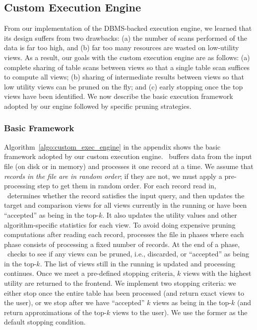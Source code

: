 

\subsection{Custom Execution Engine}
\label{sec:in_memory_execution_engine}

From our implementation of the DBMS-backed execution engine, 
we learned that its design suffers from two drawbacks:
(a) the number of scans performed of the data is far too high, and
(b) far too many resources are wasted on low-utility views.
As a result, our goals with the custom execution engine are as follows:
(a) complete sharing of table scans between views so that a single table scan
suffices to compute all views; 
(b) sharing of intermediate results between views so that low utility views can
be pruned on the fly; and 
(c) early stopping once the top views have been identified. 
We now describe the
basic execution framework adopted by our engine followed by specific
pruning strategies.

\subsubsection{Basic Framework}
\label{subsec:basic_framework}
Algorithm~\ref{algo:custom_exec_engine} in the appendix shows the basic framework adopted by our
custom execution engine.
\VizRecDB\ buffers data from the input file (on disk or in memory) and processes it
one record at a time.
We assume that {\it records in the file are in random order}; if they are not,
we must apply a pre-processing step to get them in random order.
For each record read in, \VizRecDB\ determines whether the record satisfies the
input query, and then updates the target and comparison views for all views
currently in the running or have been ``accepted'' as being in the top-$k$.
It also updates the utility values and other algorithm-specific statistics for
each view.
To avoid doing expensive pruning computations after reading each record,
\VizRecDB processes the file in phases where each phase consists of processing a
fixed number of records.
At the end of a phase, \VizRecDB\ checks to see if any views can be pruned,
i.e., discarded, or ``accepted'' as being in the top-$k$.
The list of views still in the running is updated and processing continues.
Once we meet a pre-defined stopping criteria, $k$ views with the
highest utility are returned to the frontend.
We implement two stopping criteria: we either stop once the entire table has
been processed (and return exact views to the user), or we stop after
we have ``accepted'' $k$ views as being in the top-$k$ (and return
approximations of the top-$k$ views to the user).
We use the former as the default stopping condition.

